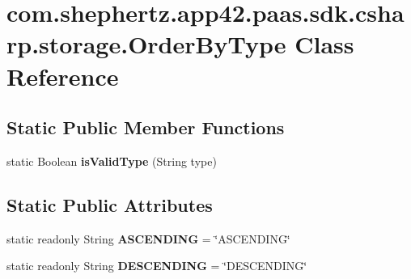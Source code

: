 \hypertarget{classcom_1_1shephertz_1_1app42_1_1paas_1_1sdk_1_1csharp_1_1storage_1_1_order_by_type}{\section{com.\+shephertz.\+app42.\+paas.\+sdk.\+csharp.\+storage.\+Order\+By\+Type Class Reference}
\label{classcom_1_1shephertz_1_1app42_1_1paas_1_1sdk_1_1csharp_1_1storage_1_1_order_by_type}
}
\subsection*{Static Public Member Functions}
\begin{DoxyCompactItemize}
\item 
\hypertarget{classcom_1_1shephertz_1_1app42_1_1paas_1_1sdk_1_1csharp_1_1storage_1_1_order_by_type_a308fb34437d4657250e22557486a8e42}{static Boolean {\bfseries is\+Valid\+Type} (String type)}\label{classcom_1_1shephertz_1_1app42_1_1paas_1_1sdk_1_1csharp_1_1storage_1_1_order_by_type_a308fb34437d4657250e22557486a8e42}

\end{DoxyCompactItemize}
\subsection*{Static Public Attributes}
\begin{DoxyCompactItemize}
\item 
\hypertarget{classcom_1_1shephertz_1_1app42_1_1paas_1_1sdk_1_1csharp_1_1storage_1_1_order_by_type_a30917b7532f196a46df48dabba3ddd93}{static readonly String {\bfseries A\+S\+C\+E\+N\+D\+I\+N\+G} = \char`\"{}A\+S\+C\+E\+N\+D\+I\+N\+G\char`\"{}}\label{classcom_1_1shephertz_1_1app42_1_1paas_1_1sdk_1_1csharp_1_1storage_1_1_order_by_type_a30917b7532f196a46df48dabba3ddd93}

\item 
\hypertarget{classcom_1_1shephertz_1_1app42_1_1paas_1_1sdk_1_1csharp_1_1storage_1_1_order_by_type_afc8d1b1aebb15a096e5713a45991ec61}{static readonly String {\bfseries D\+E\+S\+C\+E\+N\+D\+I\+N\+G} = \char`\"{}D\+E\+S\+C\+E\+N\+D\+I\+N\+G\char`\"{}}\label{classcom_1_1shephertz_1_1app42_1_1paas_1_1sdk_1_1csharp_1_1storage_1_1_order_by_type_afc8d1b1aebb15a096e5713a45991ec61}

\end{DoxyCompactItemize}
